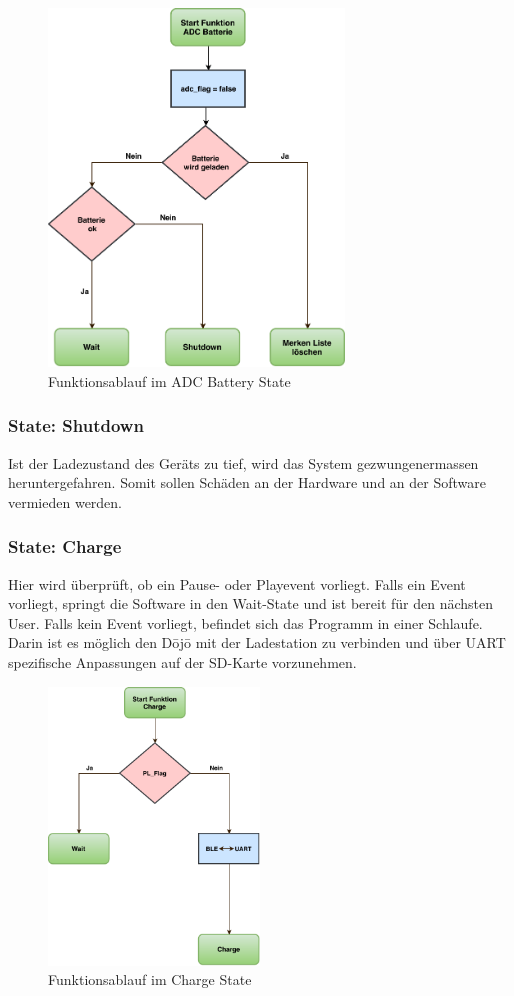 \begin{figure}[htbp!!!!]
	\centering
	\includegraphics[width=0.7\textwidth]{Data/ADC_Battery_picture.pdf}
	\caption[Statemachine: ADC Battery]{Funktionsablauf im ADC Battery State}
	\label{fig:adcBatteryState}
\end{figure} 

\subsubsection*{State: Shutdown}

Ist der Ladezustand des Geräts zu tief, wird das System gezwungenermassen heruntergefahren. Somit sollen Schäden an der Hardware und an der Software vermieden werden.

\subsubsection*{State: Charge}

Hier wird überprüft, ob ein Pause- oder Playevent vorliegt. Falls ein Event vorliegt, springt die Software in den Wait-State und ist bereit für den nächsten User. Falls kein Event vorliegt, befindet sich das Programm in einer Schlaufe. Darin ist es möglich den Dōjō mit der Ladestation zu verbinden und über UART spezifische Anpassungen auf der SD-Karte vorzunehmen.

\begin{figure}[htbp!!!!]
	\centering
	\includegraphics[width=0.5\textwidth]{Data/Charge_picture.pdf}
	\caption[Statemachine: Charge]{Funktionsablauf im Charge State}
	\label{fig:chargeState}
\end{figure} 

